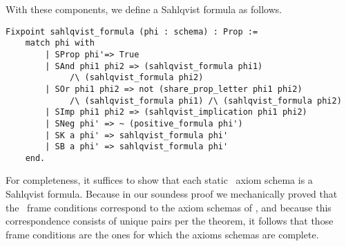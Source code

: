 With these components, we define a Sahlqvist formula as follows.

\begin{tcolorbox}
	\begin{lstlisting}[language=Coq]
Fixpoint sahlqvist_formula (phi : schema) : Prop :=
	match phi with
		| SProp phi'=> True
		| SAnd phi1 phi2 => (sahlqvist_formula phi1)
			 /\ (sahlqvist_formula phi2)
		| SOr phi1 phi2 => not (share_prop_letter phi1 phi2)
			 /\ (sahlqvist_formula phi1) /\ (sahlqvist_formula phi2)
		| SImp phi1 phi2 => (sahlqvist_implication phi1 phi2)
		| SNeg phi' => ~ (positive_formula phi')
		| SK a phi' => sahlqvist_formula phi'
		| SB a phi' => sahlqvist_formula phi'
	end.
	\end{lstlisting}
\end{tcolorbox}
 
For completeness, it suffices to show that each static \DASL\ axiom schema is a Sahlqvist formula. Because in our soundess proof we mechanically proved that the \DASL\ frame conditions correspond to the axiom schemas of \DASL, and because this correspondence consists of unique pairs per the theorem, it follows that those frame conditions are the ones for which the axioms schemas are complete.


